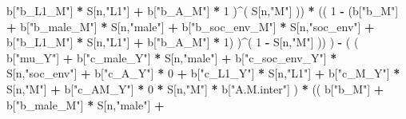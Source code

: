 \documentclass[
]{book}
\newenvironment{Shaded}{\begin{snugshade}}{\end{snugshade}}
\newcommand{\DecValTok}[1]{\textcolor[rgb]{0.00,0.00,0.81}{#1}}
\newcommand{\NormalTok}[1]{#1}
\newcommand{\SpecialCharTok}[1]{\textcolor[rgb]{0.81,0.36,0.00}{\textbf{#1}}}
\newcommand{\StringTok}[1]{\textcolor[rgb]{0.31,0.60,0.02}{#1}}
\begin{document}
\begin{Shaded}
\begin{Highlighting}[]
\NormalTok{                           b[}\StringTok{"b\_L1\_M"}\NormalTok{] }\SpecialCharTok{*}\NormalTok{ S[n,}\StringTok{"L1"}\NormalTok{] }\SpecialCharTok{+}
\NormalTok{                           b[}\StringTok{"b\_A\_M"}\NormalTok{] }\SpecialCharTok{*} \DecValTok{1}\NormalTok{ )}\SpecialCharTok{\^{}}\NormalTok{( S[n,}\StringTok{"M"}\NormalTok{] )) }\SpecialCharTok{*}
\NormalTok{                      (( }\DecValTok{1} \SpecialCharTok{{-}}\NormalTok{ (b[}\StringTok{"b\_M"}\NormalTok{] }\SpecialCharTok{+} 
\NormalTok{                                b[}\StringTok{"b\_male\_M"}\NormalTok{] }\SpecialCharTok{*}\NormalTok{ S[n,}\StringTok{"male"}\NormalTok{] }\SpecialCharTok{+} 
\NormalTok{                                b[}\StringTok{"b\_soc\_env\_M"}\NormalTok{] }\SpecialCharTok{*}\NormalTok{ S[n,}\StringTok{"soc\_env"}\NormalTok{] }\SpecialCharTok{+} 
\NormalTok{                                b[}\StringTok{"b\_L1\_M"}\NormalTok{] }\SpecialCharTok{*}\NormalTok{ S[n,}\StringTok{"L1"}\NormalTok{] }\SpecialCharTok{+}
\NormalTok{                                b[}\StringTok{"b\_A\_M"}\NormalTok{] }\SpecialCharTok{*} \DecValTok{1}\NormalTok{) )}\SpecialCharTok{\^{}}\NormalTok{( }\DecValTok{1} \SpecialCharTok{{-}}\NormalTok{ S[n,}\StringTok{"M"}\NormalTok{] )) ) }\SpecialCharTok{{-}} 
\NormalTok{                    ( ( b[}\StringTok{"mu\_Y"}\NormalTok{] }\SpecialCharTok{+} 
\NormalTok{                          b[}\StringTok{"c\_male\_Y"}\NormalTok{] }\SpecialCharTok{*}\NormalTok{ S[n,}\StringTok{"male"}\NormalTok{] }\SpecialCharTok{+} 
\NormalTok{                          b[}\StringTok{"c\_soc\_env\_Y"}\NormalTok{] }\SpecialCharTok{*}\NormalTok{ S[n,}\StringTok{"soc\_env"}\NormalTok{] }\SpecialCharTok{+}
\NormalTok{                          b[}\StringTok{"c\_A\_Y"}\NormalTok{] }\SpecialCharTok{*} \DecValTok{0} \SpecialCharTok{+}
\NormalTok{                          b[}\StringTok{"c\_L1\_Y"}\NormalTok{] }\SpecialCharTok{*}\NormalTok{ S[n,}\StringTok{"L1"}\NormalTok{] }\SpecialCharTok{+}
\NormalTok{                          b[}\StringTok{"c\_M\_Y"}\NormalTok{] }\SpecialCharTok{*}\NormalTok{ S[n,}\StringTok{"M"}\NormalTok{] }\SpecialCharTok{+} 
\NormalTok{                          b[}\StringTok{"c\_AM\_Y"}\NormalTok{] }\SpecialCharTok{*} \DecValTok{0} \SpecialCharTok{*}\NormalTok{ S[n,}\StringTok{"M"}\NormalTok{] }\SpecialCharTok{*}\NormalTok{ b[}\StringTok{"A.M.inter"}\NormalTok{] ) }\SpecialCharTok{*}
\NormalTok{                        (( b[}\StringTok{"b\_M"}\NormalTok{] }\SpecialCharTok{+} 
\NormalTok{                             b[}\StringTok{"b\_male\_M"}\NormalTok{] }\SpecialCharTok{*}\NormalTok{ S[n,}\StringTok{"male"}\NormalTok{] }\SpecialCharTok{+} 

\end{Highlighting}
\end{Shaded}
\end{document}
